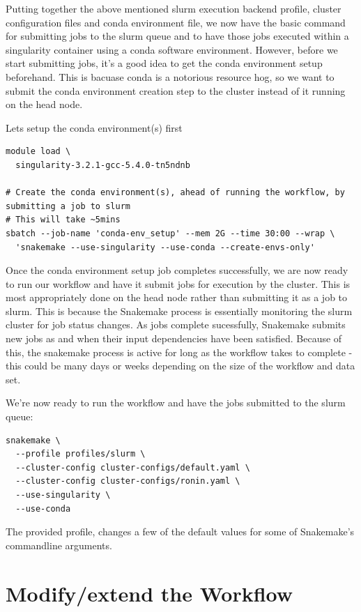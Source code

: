 Putting together the above mentioned slurm execution backend profile, cluster configuration files and conda environment file, we
now have the basic command for submitting jobs to the slurm queue and to have those jobs executed within a singularity container using
a conda software environment. However, before we start submitting jobs, it's a good idea to get the conda environment setup beforehand.
This is bacuase conda is a notorious resource hog, so we want to submit the conda environment creation step to the cluster instead of
it running on the head node.

Lets setup the conda environment(s) first

\begin{lstlisting}
module load \
  singularity-3.2.1-gcc-5.4.0-tn5ndnb

# Create the conda environment(s), ahead of running the workflow, by submitting a job to slurm
# This will take ~5mins
sbatch --job-name 'conda-env_setup' --mem 2G --time 30:00 --wrap \
  'snakemake --use-singularity --use-conda --create-envs-only'
\end{lstlisting}

Once the conda environment setup job completes successfully, we are now ready to run our workflow and have it submit jobs for execution by the
cluster. This is most appropriately done on the head node rather than submitting it as a job to slurm. This is because the Snakemake process is
essentially monitoring the slurm cluster for job status changes. As jobs complete sucessfully, Snakemake submits new jobs as and when their input
dependencies have been satisfied. Because of this, the snakemake process is active for long as the workflow takes to complete - this could be
many days or weeks depending on the size of the workflow and data set.

We're now ready to run the workflow and have the jobs submitted to the slurm queue:

\begin{lstlisting}
snakemake \
  --profile profiles/slurm \
  --cluster-config cluster-configs/default.yaml \
  --cluster-config cluster-configs/ronin.yaml \
  --use-singularity \
  --use-conda
\end{lstlisting}

The provided profile, changes a few of the default values for some of Snakemake's commandline arguments.



\section{Modify/extend the Workflow}


